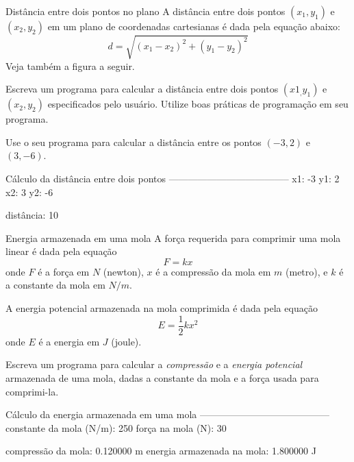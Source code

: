\documentclass[11pt,fleqn]{practice}
\begin{document}
\begin{task}[breakable]{Distância entre dois pontos no plano}{}
  A distância entre dois pontos $(x_1,y_1)$ e $(x_2,y_2)$ em um plano de
  coordenadas cartesianas é dada pela equação abaixo:
  \[ d = \sqrt{(x_1 - x_2)^2 + (y_1 - y_2)^2} \]
  Veja também a figura a seguir.

  \begin{center}
  \end{center}

  Escreva um programa para calcular a distância entre dois pontos
  $(x1_,y_1)$ e $(x_2,y_2)$ especificados pelo usuário. Utilize boas
  práticas de programação em seu programa.

  Use o seu programa para calcular a distância entre os pontos $(-3,2)$
  e $(3,-6)$.

  \begin{runexample}
Cálculo da distância entre dois pontos
--------------------------------------
x1: -3
y1: 2
x2: 3
y2: -6

distância: 10
  \end{runexample}

  \tcblower
  \solution
\end{task}

\begin{task}[breakable]{Energia armazenada em uma mola}{}
  A força requerida para comprimir uma mola linear é dada pela equação
  \[ F = k x \] onde $F$ é a força em $N$ (newton), $x$ é a compressão
  da mola em $m$ (metro), e $k$ é a constante da mola em $N/m$.

  A energia potencial armazenada na mola comprimida é dada pela equação
  \[ E = \frac{1}{2} k x^2 \] onde $E$ é a energia em $J$ (joule).

  Escreva um programa para calcular a \emph{compressão} e a
  \emph{energia potencial} armazenada de uma mola, dadas a constante da
  mola e a força usada para comprimi-la.

  \begin{runexample}
Cálculo da energia armazenada em uma mola
-----------------------------------------
constante da mola (N/m): 250
força na mola (N): 30

compressão da mola: 0.120000 m
energia armazenada na mola: 1.800000 J
  \end{runexample}

  \tcblower
  \solution
\end{task}
\end{document}
